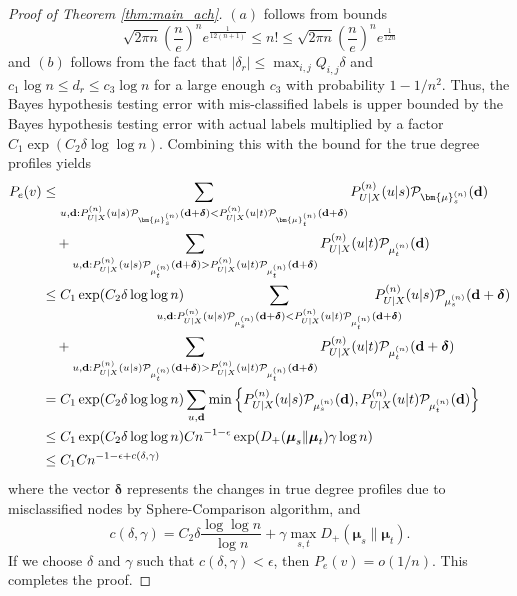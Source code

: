 \documentclass[11pt]{article}
\theoremstyle{plain}
\theoremstyle{definition}
\begin{document}
\begin{proof}[Proof of Theorem \ref{thm:main_ach}]
$(a)$ follows from \cite{robbins1955remark} bounds 
\[
\sqrt{2\pi n} \left(\frac{n}{e}\right)^n e^{\frac{1}{12(n+1)}} \le n! \le \sqrt{2\pi n} \left(\frac{n}{e}\right)^n e^{\frac{1}{12 n}}
\]
and $(b)$ follows from the fact that
$|\delta_r| \le \max_{i,j} Q_{i,j} \delta$ and $c_1 \log n \le d_r \le c_3 \log n$ for a large enough $c_3$ with probability $1-1/n^2$.
Thus, the Bayes hypothesis testing error with mis-classified labels is upper bounded by the Bayes hypothesis testing error with actual labels multiplied by a factor $C_1 \exp(C_2 \delta \log\log n)$. Combining this with the bound for the true degree profiles yields
\begin{align*}
  P_e(v) &\le  
  \sum_{u,\mathbf{d}: P^{(n)}_{U|X}(u|s) \mathcal{P}_{\bm{\mu}_s^{(n)}}(\mathbf{d}+\boldsymbol{\delta}) <
  P^{(n)}_{U|X}(u|t) \mathcal{P}_{\bm{\mu}_t^{(n)}}(\mathbf{d}+\boldsymbol{\delta})}
  P^{(n)}_{U|X}(u|s) \mathcal{P}_{\bm{\mu}_s^{(n)}}(\mathbf{d})
  \\
  &\quad +
  \sum_{u,\mathbf{d}: P^{(n)}_{U|X}(u|s) \mathcal{P}_{\mu_t^{(n)}}(\mathbf{d}+\boldsymbol{\delta}) >
  P^{(n)}_{U|X}(u|t) \mathcal{P}_{\mu_t^{(n)}}(\mathbf{d}+\boldsymbol{\delta})}
  P^{(n)}_{U|X}(u|t) \mathcal{P}_{\mu_t^{(n)}}(\mathbf{d})
  \\
  & \le C_1 \exp(C_2 \delta \log\log n) \hspace{-5ex}
    \sum_{u,\mathbf{d}: P^{(n)}_{U|X}(u|s) \mathcal{P}_{\mu_s^{(n)}}(\mathbf{d}+\boldsymbol{\delta}) <
  P^{(n)}_{U|X}(u|t) \mathcal{P}_{\mu_t^{(n)}}(\mathbf{d}+\boldsymbol{\delta})} \hspace{-5ex}
  P^{(n)}_{U|X}(u|s) \mathcal{P}_{\mu_s^{(n)}}(\mathbf{d}+\boldsymbol{\delta})
  \\
  &\quad +
  \sum_{u,\mathbf{d}: P^{(n)}_{U|X}(u|s) \mathcal{P}_{\mu_t^{(n)}}(\mathbf{d}+\boldsymbol{\delta}) >
  P^{(n)}_{U|X}(u|t) \mathcal{P}_{\mu_t^{(n)}}(\mathbf{d}+\boldsymbol{\delta})}
  P^{(n)}_{U|X}(u|t) \mathcal{P}_{\mu_t^{(n)}}(\mathbf{d}+\boldsymbol{\delta})
  \\
  & = C_1 \exp(C_2 \delta \log\log n)
  \sum_{u,\mathbf{d}} \min\Big\{
 P^{(n)}_{U|X}(u|s) \mathcal{P}_{\mu_s^{(n)}}(\mathbf{d}),
 P^{(n)}_{U|X}(u|t) \mathcal{P}_{\mu_t^{(n)}}(\mathbf{d})
  \Big\}
  \\
  &\le
  C_1 \exp(C_2 \delta \log\log n) C n^{-1-\epsilon}
  \exp(D_+(\boldsymbol{\mu}_s \| \boldsymbol{\mu}_t)\gamma \log n)
  \\
  &\le
  C_1 C n^{-1-\epsilon + c(\delta,\gamma)}
\end{align*}
where the vector $\boldsymbol{\delta}$ represents the changes in
true degree profiles due to misclassified nodes by {\sc Sphere-Comparison} algorithm,
and
\[
c(\delta, \gamma) = C_2 \delta \frac{\log \log n}{\log n }  + \gamma \max_{s,t} D_+(\bm{\mu}_s \| \bm{\mu}_t) .
\]
If we choose $\delta$ and $\gamma$ such that $c(\delta,\gamma) < \epsilon$, then $P_e(v) = o(1/n)$.
This completes the proof.
\end{proof}
\end{document}
